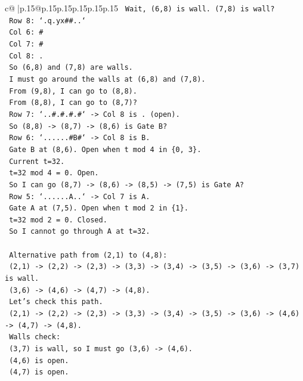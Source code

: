 \documentclass{article}
\begin{document}
{\begin{supertabular}{c@{$\;$}|p{.15\linewidth}@{}p{.15\linewidth}p{.15\linewidth}p{.15\linewidth}p{.15\linewidth}p{.15\linewidth}}
{{{\texttt{   Wait, (6,8) is wall. (7,8) is wall?} \\
\texttt{   Row 8: `.q.yx\#\#..`} \\
\texttt{   Col 6: \#} \\
\texttt{   Col 7: \#} \\
\texttt{   Col 8: .} \\
\texttt{   So (6,8) and (7,8) are walls.} \\
\texttt{   I must go around the walls at (6,8) and (7,8).} \\
\texttt{   From (9,8), I can go to (8,8).} \\
\texttt{   From (8,8), I can go to (8,7)?} \\
\texttt{   Row 7: `..\#.\#.\#.\#` {-}> Col 8 is . (open).} \\
\texttt{   So (8,8) {-}> (8,7) {-}> (8,6) is Gate B?} \\
\texttt{   Row 6: `......\#B\#` {-}> Col 8 is B.} \\
\texttt{   Gate B at (8,6). Open when t mod 4 in \{0, 3\}.} \\
\texttt{   Current t=32.} \\
\texttt{   t=32 mod 4 = 0. Open.} \\
\texttt{   So I can go (8,7) {-}> (8,6) {-}> (8,5) {-}> (7,5) is Gate A?} \\
\texttt{   Row 5: `......A..` {-}> Col 7 is A.} \\
\texttt{   Gate A at (7,5). Open when t mod 2 in \{1\}.} \\
\texttt{   t=32 mod 2 = 0. Closed.} \\
\texttt{   So I cannot go through A at t=32.} \\
\\ 
\texttt{   Alternative path from (2,1) to (4,8):} \\
\texttt{   (2,1) {-}> (2,2) {-}> (2,3) {-}> (3,3) {-}> (3,4) {-}> (3,5) {-}> (3,6) {-}> (3,7) is wall.} \\
\texttt{   (3,6) {-}> (4,6) {-}> (4,7) {-}> (4,8).} \\
\texttt{   Let's check this path.} \\
\texttt{   (2,1) {-}> (2,2) {-}> (2,3) {-}> (3,3) {-}> (3,4) {-}> (3,5) {-}> (3,6) {-}> (4,6) {-}> (4,7) {-}> (4,8).} \\
\texttt{   Walls check:} \\
\texttt{   (3,7) is wall, so I must go (3,6) {-}> (4,6).} \\
\texttt{   (4,6) is open.} \\
\texttt{   (4,7) is open.} \\
}}}
\end{supertabular}}
\end{document}
